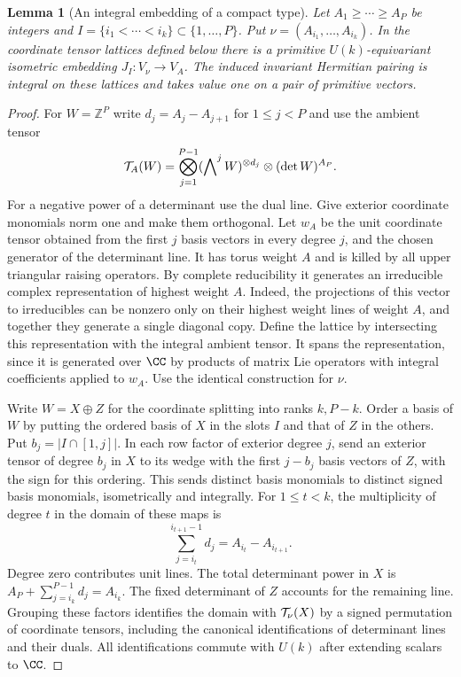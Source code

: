 \documentclass[a4paper,11pt]{article}
\newtheorem{lemma}[proposition]{Lemma}
\theoremstyle{definition}
\theoremstyle{remark}
\newcommand{\ZZ}{\mathbb Z}\newcommand{\ord}{\operatorname{ord}}
\numberwithin{equation}{section}
\begin{document}
\begin{lemma}[An integral embedding of a compact type]\label{lem:shuffle107}
Let \(A_1\ge\cdots\ge A_P\) be integers and
\(I=\{i_1<\cdots<i_k\}\subset\{1,\ldots,P\}\). Put
\(\nu=(A_{i_1},\ldots,A_{i_k})\). In the coordinate tensor
lattices defined below there is a primitive \(U(k)\)-equivariant
isometric embedding \(J_I:V_\nu\longrightarrow V_A\).
The induced invariant Hermitian pairing is integral on these
lattices and takes value one on a pair of primitive vectors.
\end{lemma}
\begin{proof}
For \(W=\ZZ^P\) write \(d_j=A_j-A_{j+1}\) for \(1\le j<P\)
and use the ambient tensor
\[
 {\cal T}_A(W)=
  \bigotimes_{j=1}^{P-1}(\bigwedge\nolimits^j W)^{\otimes d_j}
               \otimes(\det W)^{A_P}.
\]
For a negative power of a determinant use the dual line. Give
exterior coordinate monomials norm one and make them orthogonal.
Let \(w_A\) be the unit coordinate tensor obtained from the
first \(j\) basis vectors in every degree \(j\), and the chosen
generator of the determinant line. It has torus weight \(A\)
and is killed by all upper triangular raising operators. By
complete reducibility it generates an irreducible complex
representation of highest weight \(A\). Indeed, the projections of
this vector to irreducibles can be nonzero only on their
highest weight lines of weight \(A\), and together they generate
a single diagonal copy. Define the lattice by intersecting this
representation with the integral ambient tensor. It spans the
representation, since it is generated over \(\CC\) by products
of matrix Lie operators with integral coefficients applied to
\(w_A\). Use the identical construction for \(\nu\).

Write \(W=X\oplus Z\) for the coordinate splitting into ranks
\(k,P-k\). Order a basis of \(W\) by putting the ordered basis
of \(X\) in the slots \(I\) and that of \(Z\) in the others.
Put \(b_j=|I\cap[1,j]|\). In each row factor of exterior degree
\(j\), send an exterior tensor of degree \(b_j\) in \(X\) to its
wedge with the first \(j-b_j\) basis vectors of \(Z\), with the
sign for this ordering. This sends distinct basis monomials to
distinct signed basis monomials, isometrically and integrally.
For \(1\le t<k\), the multiplicity of degree \(t\) in the
domain of these maps is
\[
     \sum_{j=i_t}^{i_{t+1}-1} d_j
          = A_{i_t}-A_{i_{t+1}}.
\]
Degree zero contributes unit lines. The total determinant
power in \(X\) is
\(A_P+\sum_{j=i_k}^{P-1}d_j=A_{i_k}\).
The fixed determinant of \(Z\) accounts for the remaining
line. Grouping these factors identifies the domain with
\({\cal T}_\nu(X)\) by a signed permutation of coordinate
tensors, including the canonical identifications of determinant
lines and their duals. All identifications commute with \(U(k)\)
after extending scalars to \(\CC\).


\end{proof}
\end{document}
